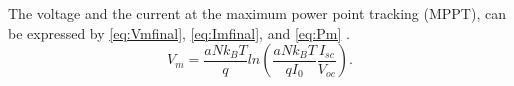 \documentclass[journal]{IEEEtran}
\begin{document}
%
%
%
%
%
%
%
%
The voltage and the current at the maximum power point tracking (MPPT), can be expressed by \eqref{eq:Vmfinal}, \eqref{eq:Imfinal}, and \eqref{eq:Pm} \cite{Saloux}. %
\begin{equation}
\label{eq:Vmfinal}
V_{m}=\dfrac{aNk_{B}T}{q} ln \left( \dfrac{aNk_{B}T}{qI_{0}} \dfrac{I_{sc}}{V_{oc}}  \right). 
\end{equation}
\end{document}
